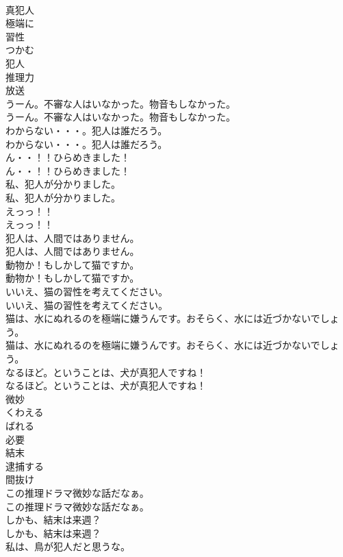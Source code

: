 \documentclass[8pt]{extreport}
\begin{document}
\begin{CJK}{UTF8}{min}
\\	真犯人
\\	極端に
\\	習性
\\	つかむ
\\	犯人
\\	推理力
\\	放送
\\	うーん。不審な人はいなかった。物音もしなかった。	
\\	うーん。不審な人はいなかった。物音もしなかった。 
\\	わからない・・・。犯人は誰だろう。	
\\	わからない・・・。犯人は誰だろう。 
\\	ん・・！！ひらめきました！	
\\	ん・・！！ひらめきました！ 
\\	私、犯人が分かりました。	
\\	私、犯人が分かりました。 
\\	えっっ！！	
\\	えっっ！！ 
\\	犯人は、人間ではありません。	
\\	犯人は、人間ではありません。 
\\	動物か！もしかして猫ですか。	
\\	動物か！もしかして猫ですか。 
\\	いいえ、猫の習性を考えてください。	
\\	いいえ、猫の習性を考えてください。 
\\	猫は、水にぬれるのを極端に嫌うんです。おそらく、水には近づかないでしょう。	
\\	猫は、水にぬれるのを極端に嫌うんです。おそらく、水には近づかないでしょう。 
\\	なるほど。ということは、犬が真犯人ですね！	
\\	なるほど。ということは、犬が真犯人ですね！ 
\\	微妙
\\	くわえる
\\	ばれる
\\	必要
\\	結末
\\	逮捕する
\\	間抜け
\\	この推理ドラマ微妙な話だなぁ。	
\\	この推理ドラマ微妙な話だなぁ。 
\\	しかも、結末は来週？	
\\	しかも、結末は来週？ 
\\	私は、鳥が犯人だと思うな。	

\end{CJK}
\end{document}
